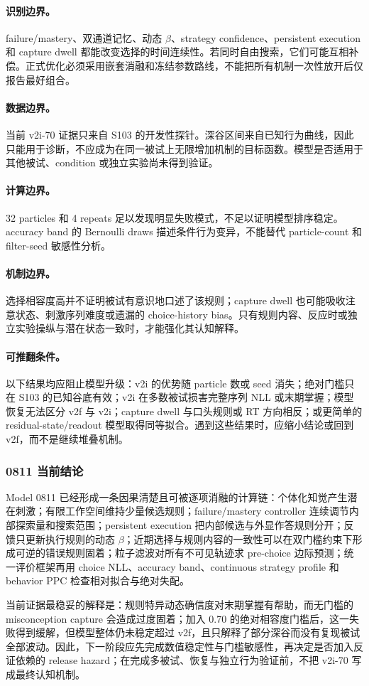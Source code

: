 \paragraph{识别边界。}
failure/mastery、双通道记忆、动态 $\beta$、strategy confidence、persistent execution 和 capture dwell 都能改变选择的时间连续性。若同时自由搜索，它们可能互相补偿。正式优化必须采用嵌套消融和冻结参数路线，不能把所有机制一次性放开后仅报告最好组合。

\paragraph{数据边界。}
当前 v2i-70 证据只来自 S103 的开发性探针。深谷区间来自已知行为曲线，因此只能用于诊断，不应成为在同一被试上无限增加机制的目标函数。模型是否适用于其他被试、condition 或独立实验尚未得到验证。

\paragraph{计算边界。}
32 particles 和 4 repeats 足以发现明显失败模式，不足以证明模型排序稳定。accuracy band 的 Bernoulli draws 描述条件行为变异，不能替代 particle-count 和 filter-seed 敏感性分析。

\paragraph{机制边界。}
选择相容度高并不证明被试有意识地口述了该规则；capture dwell 也可能吸收注意状态、刺激序列难度或遗漏的 choice-history bias。只有规则内容、反应时或独立实验操纵与潜在状态一致时，才能强化其认知解释。

\paragraph{可推翻条件。}
以下结果均应阻止模型升级：v2i 的优势随 particle 数或 seed 消失；绝对门槛只在 S103 的已知谷底有效；v2i 在多数被试损害完整序列 NLL 或末期掌握；模型恢复无法区分 v2f 与 v2i；capture dwell 与口头规则或 RT 方向相反；或更简单的 residual-state/readout 模型取得同等拟合。遇到这些结果时，应缩小结论或回到 v2f，而不是继续堆叠机制。


\subsubsection{0811 当前结论}

Model 0811 已经形成一条因果清楚且可被逐项消融的计算链：个体化知觉产生潜在刺激；有限工作空间维持少量候选规则；failure/mastery controller 连续调节内部探索量和搜索范围；persistent execution 把内部候选与外显作答规则分开；反馈只更新执行规则的动态 $\beta$；近期选择与规则内容的一致性可以在双门槛约束下形成可逆的错误规则固着；粒子滤波对所有不可见轨迹求 pre-choice 边际预测；统一评价框架再用 choice NLL、accuracy band、continuous strategy profile 和 behavior PPC 检查相对拟合与绝对失配。

当前证据最稳妥的解释是：规则特异动态确信度对末期掌握有帮助，而无门槛的 misconception capture 会造成过度固着；加入 0.70 的绝对相容度门槛后，这一失败得到缓解，但模型整体仍未稳定超过 v2f，且只解释了部分深谷而没有复现被试全部波动。因此，下一阶段应先完成数值稳定性与门槛敏感性，再决定是否加入反证依赖的 release hazard；在完成多被试、恢复与独立行为验证前，不把 v2i-70 写成最终认知机制。

